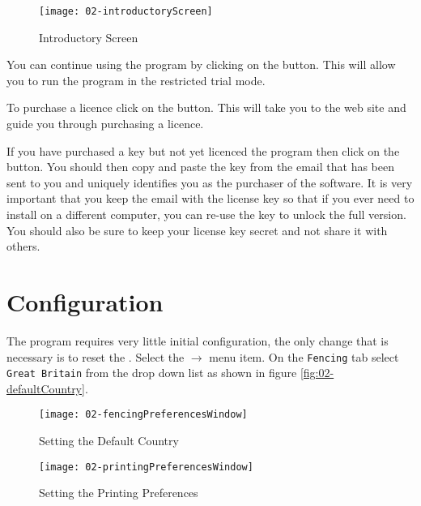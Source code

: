 \documentclass[a4paper,11pt]{memoir}
\begin{document}
\begin{figure}[!ht]
 \centering
 \texttt{[image: 02-introductoryScreen]}
 \caption{Introductory Screen}\label{fig:02-introductoryScreen}
\end{figure}

You can continue using the program by clicking on the  button. This will allow you to run the program in the restricted trial mode.

To purchase a licence click on the  button. This will take you to the \fencingtime{} web site and guide you through purchasing a licence.

If you have purchased a key but not yet licenced the program then click on the  button. You should then copy and paste the key from the email that has been sent to you and uniquely identifies you as the purchaser of the software. It is very important that you keep the email with the license key so that if you ever need to install \fencingtime{} on a different computer, you can re-use the key to unlock the full version. You should also be sure to keep your license key secret and not share it with others.

\section{Configuration}
The program requires very little initial configuration, the only change that is necessary is to reset the . Select the   $\rightarrow$  menu item. On the \texttt{Fencing} tab select \texttt{Great Britain} from the drop down list as shown in figure \ref{fig:02-defaultCountry}.

\begin{figure}[!ht]
  \centering
  \begin{minipage}{0.4\textwidth}
    \centering
    \texttt{[image: 02-fencingPreferencesWindow]}
    \caption{Setting the Default Country}\label{fig:02-defaultCountry}
  \end{minipage}
  \hfill
  \begin{minipage}{0.4\textwidth}
    \centering
    \texttt{[image: 02-printingPreferencesWindow]}
    \caption{Setting the Printing Preferences} \label{fig:02-printingPreferences}
  \end{minipage}
\end{figure}
\end{document}

